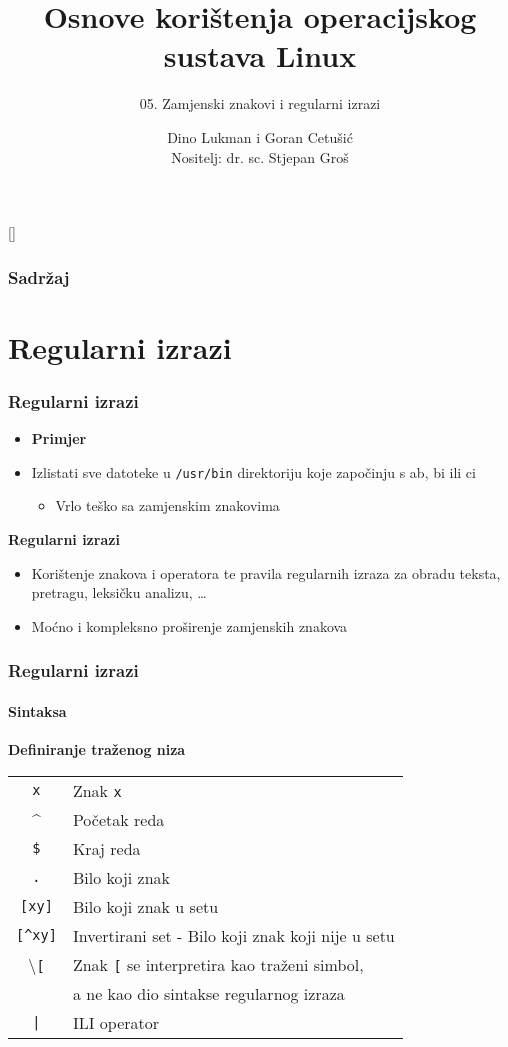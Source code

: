 \documentclass[table,usenames,dvipsnames]{beamer}
\title{Osnove korištenja operacijskog sustava Linux}
\subtitle{05. Zamjenski znakovi i regularni izrazi}
\author[Dino Lukman i Goran Cetušić]{Dino Lukman i Goran Cetušić\\{\small Nositelj: dr. sc. Stjepan Groš}}
\institute[FER]{Sveučilište u Zagrebu \\
				Fakultet elektrotehnike i računarstva}
\date{\todayiso}
\newcommand{\shell}[1]{\texttt{#1}}
\begin{document}
{
[] %

\begin{frame}
\maketitle
\end{frame}
}

\begin{frame}
\frametitle{Sadržaj}
\tableofcontents
\end{frame}


\section{Regularni izrazi}
\begin{frame}[t]
\frametitle{Regularni izrazi}
\begin{itemize}
  \item \textbf{Primjer}
  \item[] Izlistati sve datoteke u \shell{/usr/bin} direktoriju koje započinju s ab, bi ili ci
  \begin{itemize}
	  \item Vrlo teško sa zamjenskim znakovima
  \end{itemize}
\end{itemize}
\vfill
\textbf{Regularni izrazi}
  \begin{itemize}
    \item Korištenje znakova i operatora te pravila regularnih izraza za 
          obradu teksta, pretragu, leksičku analizu, \ldots
    \item Moćno i kompleksno proširenje zamjenskih znakova
  \end{itemize}
\vfill
\end{frame}

\begin{frame}[t]
\frametitle{Regularni izrazi}
\framesubtitle{Sintaksa}
\textbf{Definiranje traženog niza}
\begin{table}[h]
\begin{tabular}{c l}
  \shell{x} & Znak \shell{x}\\
  \textasciicircum{} & Početak reda \\
  \shell{\$} & Kraj reda \\
  \shell{.} & Bilo koji znak \\
  \shell{[xy]} & Bilo koji znak u setu \\
  \shell{[\textasciicircum{}xy]} &  Invertirani set - Bilo koji znak koji nije u setu \\
  \textbackslash{}\shell{[} & Znak \shell{[} se interpretira kao traženi simbol, \\
  & a ne kao dio sintakse regularnog izraza \\
  \shell{|} & ILI operator \\
\end{tabular}
\end{table}
\end{frame}
\end{document}
